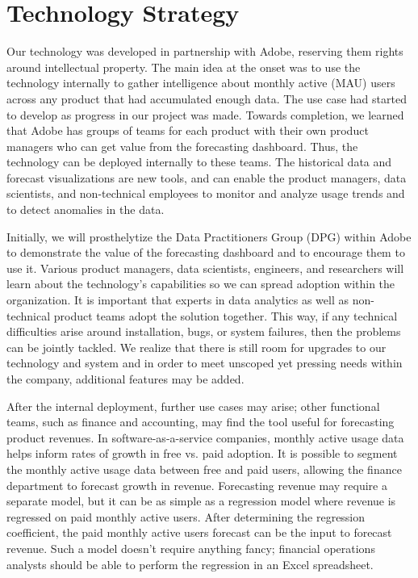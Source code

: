 \documentclass[11pt, oneside, authoryear]{report}
\begin{document}
\section{Technology Strategy}
Our technology was developed in partnership with Adobe, reserving them rights around intellectual property. The main idea at the onset was to use the technology internally to gather intelligence about monthly active (MAU) users across any product that had accumulated enough data. The use case had started to develop as progress in our project was made. Towards completion, we learned that Adobe has groups of teams for each product with their own product managers who can get value from the forecasting dashboard. Thus, the technology can be deployed internally to these teams. The historical data and forecast visualizations are new tools, and can enable the product managers, data scientists, and non-technical employees to monitor and analyze usage trends and to detect anomalies in the data.

Initially, we will prosthelytize the Data Practitioners Group (DPG) within Adobe to demonstrate the value of the forecasting dashboard and to encourage them to use it. Various product managers, data scientists, engineers, and researchers will learn about the technology's capabilities so we can spread adoption within the organization. It is important that experts in data analytics as well as non-technical product teams adopt the solution together. This way, if any technical difficulties arise around installation, bugs, or system failures, then the problems can be jointly tackled. We realize that there is still room for upgrades to our technology and system and in order to meet unscoped yet pressing needs within the company, additional features may be added.

After the internal deployment, further use cases may arise; other functional teams, such as finance and accounting, may find the tool useful for forecasting product revenues. In software-as-a-service companies, monthly active usage data helps inform rates of growth in free vs. paid adoption. It is possible to segment the monthly active usage data between free and paid users, allowing the finance department to forecast growth in revenue. Forecasting revenue may require a separate model, but it can be as simple as a regression model where revenue is regressed on paid monthly active users. After determining the regression coefficient, the paid monthly active users forecast can be the input to forecast revenue. Such a model doesn't require anything fancy; financial operations analysts should be able to perform the regression in an Excel spreadsheet.
\end{document}
